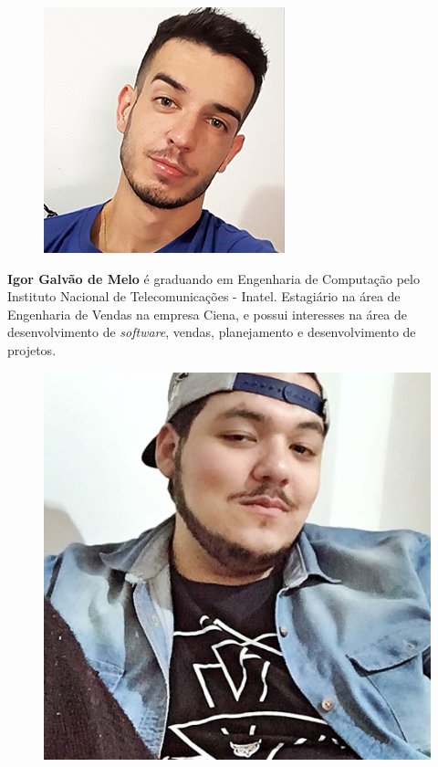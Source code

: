 \begin{figure}
\includegraphics[width=\linewidth]{figuras/autor_igor.png}
\end{figure}

\textbf{Igor Galvão de Melo} é graduando em Engenharia de Computação pelo Instituto Nacional de Telecomunicações - Inatel. Estagiário na área de Engenharia de Vendas na empresa Ciena, e possui interesses na área de desenvolvimento de \textit{software}, vendas, planejamento e desenvolvimento de projetos.\newline

\begin{figure}
\includegraphics[width=\linewidth]{figuras/autor_lucas.jpg}
\end{figure}

